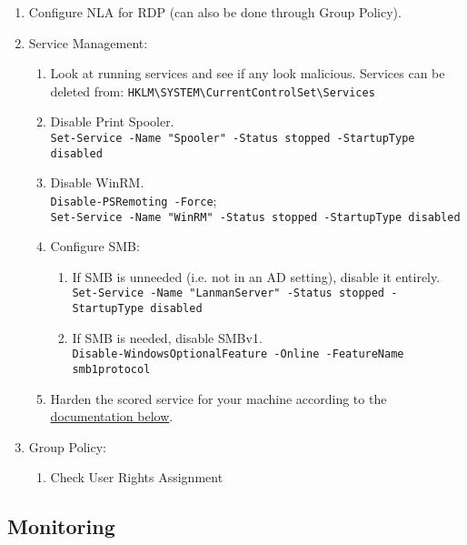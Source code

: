 \documentclass[12pt,letterpaper]{article}
\def\code#1{\textcolor{iris}{\texttt{#1}}}
\begin{document}
\begin{enumerate}
	\item Configure NLA for RDP (can also be done through Group Policy).
	\item Service Management:
	\begin{enumerate}
		\item Look at running services and see if any look malicious. Services can be deleted from:
			\code{HKLM\textbackslash{}SYSTEM\textbackslash{}CurrentControlSet\textbackslash{}Services}
		\item Disable Print Spooler. \\
			\code{Set-Service -Name "Spooler" -Status stopped -StartupType disabled}
		\item Disable WinRM. \\
			\code{Disable-PSRemoting -Force}; \\
			\code{Set-Service -Name "WinRM" -Status stopped -StartupType disabled}
		\item Configure SMB:
		\begin{enumerate}
			\item If SMB is unneeded (i.e. not in an AD setting), disable it entirely. \\
				\code{Set-Service -Name "LanmanServer" -Status stopped -StartupType disabled}
			\item If SMB is needed, disable SMBv1. \\
				\code{Disable-WindowsOptionalFeature -Online -FeatureName smb1protocol}
		\end{enumerate}
		\item Harden the scored service for your machine according to the \hyperref[sec:services]{documentation below}.
	\end{enumerate}
	\item Group Policy:
	\begin{enumerate}
		\item Check User Rights Assignment
	\end{enumerate}

\end{enumerate}

\subsection{Monitoring}
\end{document}
